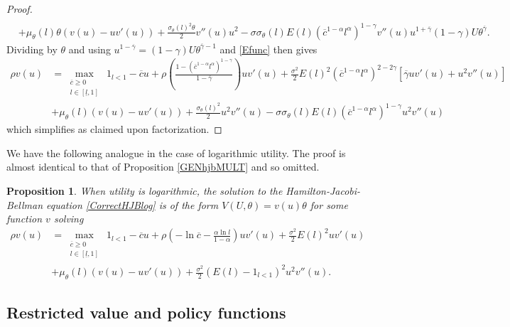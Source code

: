 \documentclass[11pt]{article}
\theoremstyle{plain}
\newtheorem{prop}[thm]{Proposition}
\begin{document}
\begin{proof}
\begin{align*}
\\ & + \mu_{\theta}(l)\theta(v(u) - uv'(u)) + \frac{\sigma_{\theta}(l)^2 \theta }{2}v''(u)u^2 - \sigma \sigma_{\theta}(l)E(l){\left(\overline{c}^{1-\alpha}l^\alpha\right)}^{1-\gamma} v''(u)u^{1+\overline{\gamma}}(1-\gamma)U\theta^{\overline{\gamma}}. %
\end{align*}
Dividing by $\theta$ and using $u^{1-\overline{\gamma}} = (1-\gamma)U\theta^{\overline{\gamma}-1}$ and \eqref{Efunc} then gives
\begin{align*}
\rho v(u) & = \max_{\substack{\overline{c} \geq 0 \\ l \in [\underline{l}, 1]}} \ 1_{l<1} - \overline{c}u + \rho {\left(\frac{1 -  {\left(\overline{c}^{1-\alpha}l^\alpha\right)}^{1-\gamma}}{1-\overline{\gamma}}\right)}uv'(u) + \frac{\sigma^2}{2}E(l)^2{\left(\overline{c}^{1-\alpha}l^\alpha\right)}^{2-2\gamma}[\overline{\gamma} uv'(u) + u^2 v''(u)] 
\\ & + \mu_{\theta}(l) (v(u) - uv'(u)) + \frac{\sigma_{\theta}(l)^2}{2}u^2v''(u) - \sigma \sigma_{\theta}(l)E(l) {\left(\overline{c}^{1-\alpha}l^{\alpha} \right)}^{1-\gamma}u^2 v''(u)
\end{align*}
which simplifies as claimed upon factorization. 
\end{proof}

We have the following analogue in the case of logarithmic utility. The proof is almost identical to that of Proposition \ref{GENhjbMULT} and so omitted.

\begin{prop} \label{GENhjbMULTlog}
When utility is logarithmic, the solution to the Hamilton-Jacobi-Bellman equation \eqref{CorrectHJBlog} is of the form $V(U,\theta) = v(u)\theta$ for some function $v$ solving 
\begin{align*}
\rho v(u) & = \max_{\substack{\overline{c} \geq 0 \\ l \in [\underline{l}, 1]}} \ 1_{l<1} - \overline{c}u + \rho {\left(-\ln \overline{c} - \frac{\alpha \ln l}{1-\alpha}\right)}uv'(u) + \frac{\sigma^2}{2}E(l)^2 uv'(u)
\\ & + \mu_{\theta}(l)(v(u) - uv'(u)) + \frac{\sigma^2}{2}{\left(E(l) - 1_{l<1}\right)}^2 u^2v''(u).
\end{align*}
\end{prop}

\subsection{Restricted value and policy functions} \label{restAPP}
\end{document}
